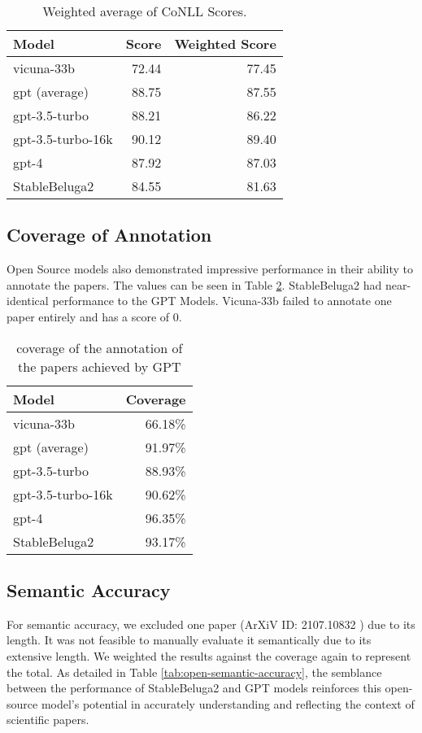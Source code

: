 \begin{table}[htpb]
  \centering
  \begin{tabular}{lrr}
    \hline
    Model & Score & Weighted Score \\
    \hline
    vicuna-33b & 72.44 & 77.45 \\
    gpt (average) & 88.75 & 87.55 \\
    gpt-3.5-turbo & 88.21 & 86.22 \\
    gpt-3.5-turbo-16k & 90.12 & 89.40 \\
    gpt-4 & 87.92 & 87.03 \\
    StableBeluga2 & 84.55 & 81.63 \\
    \hline
  \end{tabular}
  \caption[CoNLL Scores]{Weighted average of CoNLL Scores.}
  \label{tab:open-source-conll-score}
\end{table}


\subsection{Coverage of Annotation}
Open Source models also demonstrated impressive performance in their ability to annotate the papers. The values can be seen in Table \ref{tab:open-coverage}. StableBeluga2 had near-identical performance to the GPT Models. Vicuna-33b failed to annotate one paper entirely and has a score of 0.

\begin{table}[htpb]
  \centering
  \begin{tabular}{lr}
    \hline
    Model & Coverage \\
    \hline
    vicuna-33b & 66.18\% \\
    gpt (average) & 91.97\% \\
    gpt-3.5-turbo & 88.93\% \\
    gpt-3.5-turbo-16k & 90.62\% \\
    gpt-4 & 96.35\% \\
    StableBeluga2 & 93.17\% \\
    \hline
  \end{tabular}
  \caption[Total coverage]{coverage of the annotation of the papers achieved by GPT}
  \label{tab:open-coverage}
\end{table}

\subsection{Semantic Accuracy}
For semantic accuracy, we excluded one paper (ArXiV ID: 2107.10832 \citep{singleton2021logic}) due to its length. It was not feasible to manually evaluate it semantically due to its extensive length. We weighted the results against the coverage again to represent the total. As detailed in Table \ref{tab:open-semantic-accuracy}, the semblance between the performance of StableBeluga2 and GPT models reinforces this open-source model's potential in accurately understanding and reflecting the context of scientific papers.

